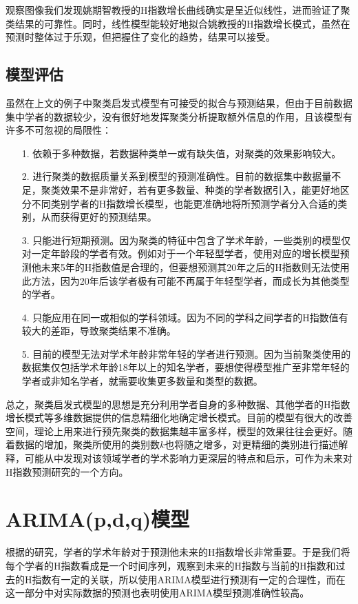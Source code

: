 \documentclass[lang=cn,11pt,a4paper,cite=authoryear]{elegantpaper}
\begin{document}
观察图像我们发现姚期智教授的H指数增长曲线确实是呈近似线性，进而验证了聚类结果的可靠性。同时，线性模型能较好地拟合姚教授的H指数增长模式，虽然在预测时整体过于乐观，但把握住了变化的趋势，结果可以接受。

\subsection{模型评估}

虽然在上文的例子中聚类启发式模型有可接受的拟合与预测结果，但由于目前数据集中学者的数据较少，没有很好地发挥聚类分析提取额外信息的作用，且该模型有许多不可忽视的局限性：

\begin{itemize}
	\item[1.] 依赖于多种数据，若数据种类单一或有缺失值，对聚类的效果影响较大。
	\item[2.] 进行聚类的数据质量关系到模型的预测准确性。目前的数据集中数据量不足，聚类效果不是非常好，若有更多数量、种类的学者数据引入，能更好地区分不同类别学者的H指数增长模型，也能更准确地将所预测学者分入合适的类别，从而获得更好的预测结果。
	\item[3.] 只能进行短期预测。因为聚类的特征中包含了学术年龄，一些类别的模型仅对一定年龄段的学者有效。例如对于一个年轻型学者，使用对应的增长模型预测他未来5年的H指数值是合理的，但要想预测其20年之后的H指数则无法使用此方法，因为20年后该学者极有可能不再属于年轻型学者，而成长为其他类型的学者。
	\item[4.] 只能应用在同一或相似的学科领域。因为不同的学科之间学者的H指数值有较大的差距，导致聚类结果不准确。
	\item[5.] 目前的模型无法对学术年龄非常年轻的学者进行预测。因为当前聚类使用的数据集仅包括学术年龄18年以上的知名学者，要想使得模型推广至非常年轻的学者或非知名学者，就需要收集更多数量和类型的数据。
\end{itemize}

总之，聚类启发式模型的思想是充分利用学者自身的多种数据、其他学者的H指数增长模式等多维数据提供的信息精细化地确定增长模式。目前的模型有很大的改善空间，理论上用来进行预先聚类的数据集越丰富多样，模型的效果往往会更好。随着数据的增加，聚类所使用的类别数$k$也将随之增多，对更精细的类别进行描述解释，可能从中发现对该领域学者的学术影响力更深层的特点和启示，可作为未来对H指数预测研究的一个方向。

\section{ARIMA(p,d,q)模型}

根据\cite{PennerPan-511}的研究，学者的学术年龄对于预测他未来的H指数增长非常重要。于是我们将每个学者的H指数看成是一个时间序列，观察到未来的H指数与当前的H指数和过去的H指数有一定的关联，所以使用ARIMA模型进行预测有一定的合理性，而在这一部分中对实际数据的预测也表明使用ARIMA模型预测准确性较高。
\end{document}
